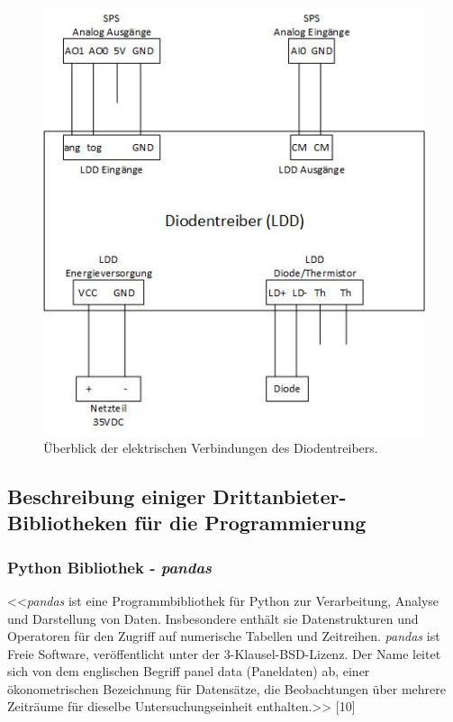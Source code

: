 \begin{appendix}
\clearpage

\begin{figure}[H]
    \centering
    \includegraphics[scale=1.2, angle=90]{98_images/fhnw_pro6m_el_schema_ldd.jpg}
    \caption{Überblick der elektrischen Verbindungen des Diodentreibers.}
    \label{fig:electric_ldd}
\end{figure}

\clearpage

\subsection{Beschreibung einiger Drittanbieter-Bibliotheken für die Programmierung}


\subsubsection{Python Bibliothek - \textit{pandas}}
<<\textit{pandas} ist eine Programmbibliothek für Python zur Verarbeitung, Analyse und Darstellung von Daten. Insbesondere enthält sie Datenstrukturen und Operatoren für den Zugriff auf numerische Tabellen und Zeitreihen. \textit{pandas} ist Freie Software, veröffentlicht unter der 3-Klausel-BSD-Lizenz. Der Name leitet sich von dem englischen Begriff panel data (Paneldaten) ab, einer ökonometrischen Bezeichnung für Datensätze, die Beobachtungen über mehrere Zeiträume für dieselbe Untersuchungseinheit enthalten.>> [10]


\end{appendix}
